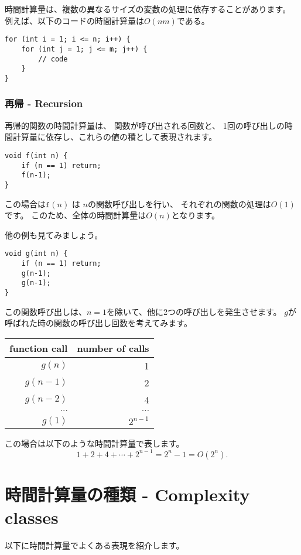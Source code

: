 時間計算量は、複数の異なるサイズの変数の処理に依存することがあります。
例えば、以下のコードの時間計算量は$O(nm)$である。
\begin{lstlisting}
for (int i = 1; i <= n; i++) {
    for (int j = 1; j <= m; j++) {
        // code
    }
}
\end{lstlisting}

\subsubsection*{再帰 - Recursion}

再帰的関数の時間計算量は、
関数が呼び出される回数と、
1回の呼び出しの時間計算量に依存し、これらの値の積として表現されます。
\begin{lstlisting}
void f(int n) {
    if (n == 1) return;
    f(n-1);
}
\end{lstlisting}
この場合は$\texttt{f}(n)$ は $n$の関数呼び出しを行い、
それぞれの関数の処理は$O(1)$です。
このため、全体の時間計算量は$O(n)$となります。

他の例も見てみましょう。
\begin{lstlisting}
void g(int n) {
    if (n == 1) return;
    g(n-1);
    g(n-1);
}
\end{lstlisting}

この関数呼び出しは、$n = 1$を除いて、他に2つの呼び出しを発生させます。
$g$が呼ばれた時の関数の呼び出し回数を考えてみます。
\begin{center}
\begin{tabular}{rr}
function call & number of calls \\
\hline
$g(n)$ & 1 \\
$g(n-1)$ & 2 \\
$g(n-2)$ & 4 \\
$\cdots$ & $\cdots$ \\
$g(1)$ & $2^{n-1}$ \\
\end{tabular}
\end{center}
この場合は以下のような時間計算量で表します。
\[1+2+4+\cdots+2^{n-1} = 2^n-1 = O(2^n).\]

\section{時間計算量の種類 - Complexity classes}


以下に時間計算量でよくある表現を紹介します。

